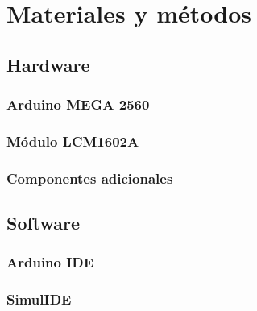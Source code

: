 \chapter{Materiales y métodos}

\section{Hardware}
\subsection{Arduino MEGA 2560}
\subsection{Módulo LCM1602A}
\subsection{Componentes adicionales}

\section{Software}
\subsection{Arduino IDE}
\subsection{SimulIDE}